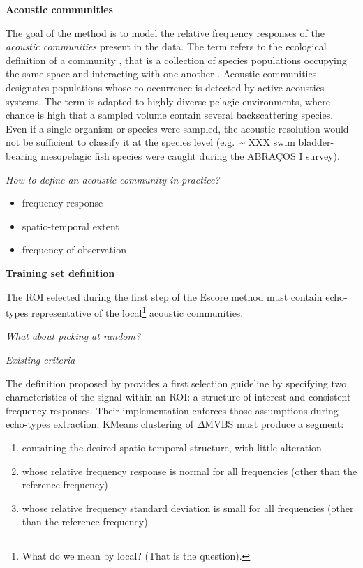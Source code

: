 \documentclass[
  10pt,
  letterpaper,
]{article}
\providecommand{\tightlist}{%
  \setlength{\itemsep}{0pt}\setlength{\parskip}{0pt}}
\begin{document}
\textbf{Acoustic communities}

The goal of the method is to model the relative frequency responses of
the \emph{acoustic communities} present in the data. The term refers to
the ecological definition of a community , that is a collection of
species populations occupying the same space and interacting with one
another \citep{putman1984}. Acoustic communities designates populations
whose co-occurrence is detected by active acoustics systems. The term is
adapted to highly diverse pelagic environments, where chance is high
that a sampled volume contain several backscattering species. Even if a
single organism or species were sampled, the acoustic resolution would
not be sufficient to classify it at the species level
(e.g.~\textasciitilde{} XXX swim bladder-bearing mesopelagic fish
species were caught during the ABRAÇOS I survey).

\emph{How to define an acoustic community in practice?}

\begin{itemize}
\tightlist
\item
  frequency response
\item
  spatio-temporal extent
\item
  frequency of observation
\end{itemize}

\textbf{Training set definition}

The ROI selected during the first step of the Escore method must contain
echo-types representative of the local\footnote{What do we mean by
  local? (That is the question).} acoustic communities.

\emph{What about picking at random?}

\emph{Existing criteria}

The definition proposed by \citet{annasawmy2024} provides a first
selection guideline by specifying two characteristics of the signal
within an ROI: a structure of interest and consistent frequency
responses. Their implementation enforces those assumptions during
echo-types extraction. KMeans clustering of \(\Delta \text{MVBS}\) must
produce a segment:

\begin{enumerate}
\def\labelenumi{\arabic{enumi}.}
\tightlist
\item
  containing the desired spatio-temporal structure, with little
  alteration
\item
  whose relative frequency response is normal for all frequencies (other
  than the reference frequency)
\item
  whose relative frequency standard deviation is small for all
  frequencies (other than the reference frequency)
\end{enumerate}
\end{document}
